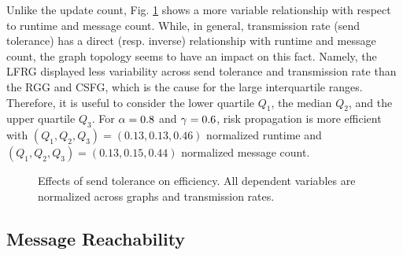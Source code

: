 Unlike the update count, Fig. \ref{fig:efficiency} shows a more variable relationship with respect to runtime and message count. While, in general, transmission rate (send tolerance) has a direct (resp. inverse) relationship with runtime and message count, the graph topology seems to have an impact on this fact. Namely, the LFRG displayed less variability across send tolerance and transmission rate than the RGG and CSFG, which is the cause for the large interquartile ranges. Therefore, it is useful to consider the lower quartile $Q_1$, the median $Q_2$, and the upper quartile $Q_3$. For $\alpha = 0.8 $ and $\gamma = 0.6$, risk propagation is more efficient with $(Q_{1}, Q_{2}, Q_{3}) = (0.13, 0.13, 0.46)$ normalized runtime and $(Q_{1}, Q_{2}, Q_{3}) = (0.13, 0.15, 0.44)$ normalized message count.
\begin{figure}[htbp]
	\centering
	\caption[Effects of send tolerance on efficiency]{Effects of send tolerance on efficiency. All dependent variables are normalized across graphs and transmission rates.}
	\label{fig:efficiency}
\end{figure}

\subsection{Message Reachability}

